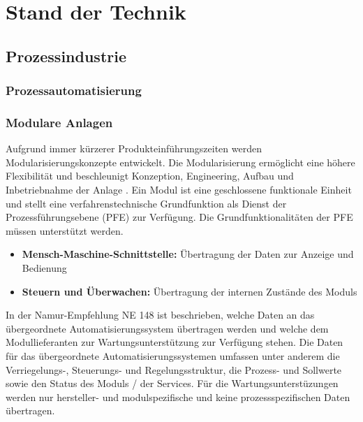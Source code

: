 
\chapter{Stand der Technik}
\label{sec:StandDerTechnik}


\section{Prozessindustrie}


\subsection{Prozessautomatisierung}


\subsection{Modulare Anlagen}
Aufgrund immer kürzerer Produkteinführungszeiten werden Modularisierungskonzepte entwickelt. Die Modularisierung ermöglicht eine höhere Flexibilität und beschleunigt Konzeption, Engineering, Aufbau und Inbetriebnahme der Anlage \cite{Urbas2012}. Ein Modul ist eine geschlossene funktionale Einheit und stellt eine verfahrenstechnische Grundfunktion als Dienst der Prozessführungsebene (PFE) zur Verfügung. Die Grundfunktionalitäten der PFE müssen unterstützt werden. \cite{Bernshausen2016}
\begin{itemize}
\item \textbf{Mensch-Maschine-Schnittstelle:} Übertragung der Daten zur Anzeige und Bedienung
\item \textbf{Steuern und Überwachen:} Übertragung der internen Zustände des Moduls
\end{itemize}

In der Namur-Empfehlung NE 148 \cite{NAMURArbeitskreis1.122013} ist beschrieben, welche Daten an das übergeordnete Automatisierungssystem übertragen werden und welche dem Modullieferanten zur Wartungsunterstützung zur Verfügung stehen. Die Daten für das übergeordnete Automatisierungssystemen umfassen unter anderem die Verriegelungs-, Steuerungs- und Regelungsstruktur, die Prozess- und Sollwerte sowie den Status des Moduls / der Services. Für die Wartungsunterstüzungen werden nur hersteller- und modulspezifische und keine prozessspezifischen Daten übertragen.

